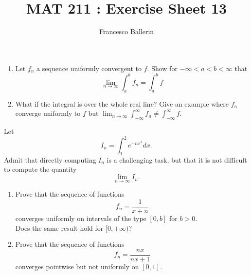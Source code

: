 \documentclass[11pt]{article}%
\title{MAT 211 : Exercise Sheet 13}
\author{Francesco Ballerin}
\date{\color{gray}{\small{francesco.ballerin@uib.no}}}
\begin{document}
\begin{minipage}[t]{\dimexpr \textwidth-6cm-\columnsep}
     \maketitle
\end{minipage}
\hfill\noindent{}

\vspace{50pt}

\begin{Exercise}[title={*}]

\begin{enumerate}
	\item Let $f_n$ a sequence uniformly convergent to $f$. Show for $-\infty<a<b<\infty$ that  $$\displaystyle\lim_{n\rightarrow\infty} \int_{a}^{b} f_n=\int_a^b f$$  
	\item What if the integral is over the whole real line? Give an example where $f_n$ converge uniformly to $f$ but $\displaystyle\lim_{n\to\infty}\int_{-\infty}^{\infty}f_n \neq \int_{-\infty}^{\infty}f$.
\end{enumerate}
\end{Exercise}
\bigskip

\begin{Exercise}[title={*}]
Let $$\displaystyle I_n=\int_{1}^2 e^{-nx^2} dx.$$ Admit that directly computing $I_n$ is a challenging task, but that it is not difficult to compute the quantity $$\lim_{n\to\infty} I_n.$$
\end{Exercise}
\bigskip

\begin{Exercise}[title={**$\dagger$}]
\begin{enumerate}
	\item Prove that the sequence of functions $$f_n=\frac{1}{x+n}$$ converges uniformly on intervals of the type $[0,b]$ for $b>0$.\\Does the same result hold for $[0,+\infty)$?
	\item Prove that the sequence of functions $$f_n=\frac{nx}{nx+1}$$ converges pointwise but not uniformly on $[0,1]$.
\end{enumerate}
\end{Exercise}
\end{document}
